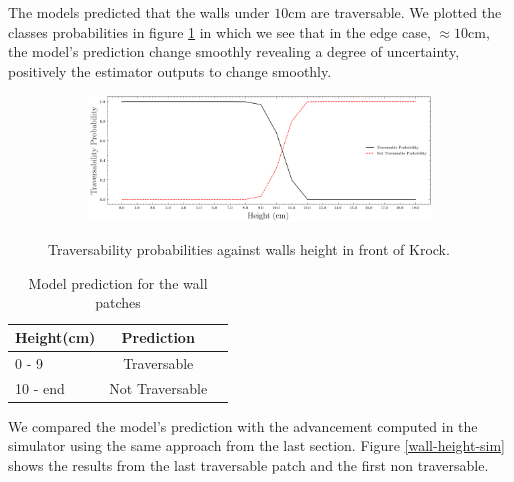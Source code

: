 \documentclass[../document.tex]{subfiles}
\begin{document}
The models predicted that the walls under $10$cm are traversable. We plotted the classes probabilities in figure \ref{fig : walls-height-preds} in which we see that in the edge case, $\approx 10$cm, the model's prediction change smoothly revealing a degree of uncertainty, positively the estimator outputs to change smoothly.
\begin{figure} [htbp]
    \centering
\begin{subfigure}[b]{1\textwidth}
    \includegraphics[width=\linewidth]{../img/5/custom_patches/walls_increasing/predictions.png}
    \end{subfigure}
    \caption{Traversability probabilities against walls height in front of Krock.}
\label{fig : walls-height-preds}
\end{figure}

\begin{table} [htbp]
    \centering
    \begin{tabular}{l|cc}
        Height(cm) & Prediction \\ 
        \hline
        0 - 9  & Traversable \\ 
        10 - end & Not Traversable \\ 
        \hline
    \end{tabular}
    \caption{Model prediction for the wall patches}
\end{table}
We compared the model's prediction with the advancement computed in the simulator using the same approach from the last section. Figure \ref{wall-height-sim} shows the results from the last traversable patch and the first non traversable.
\end{document}
